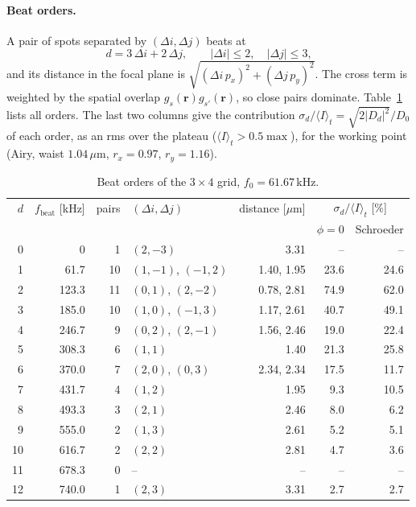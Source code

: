 \paragraph{Beat orders.}
A pair of spots separated by $(\Delta i,\Delta j)$ beats at
\begin{equation}
d=3\,\Delta i+2\,\Delta j ,
\qquad
|\Delta i|\le2,\quad|\Delta j|\le3 ,
\end{equation}
and its distance in the focal plane is
$\sqrt{(\Delta i\,p_x)^2+(\Delta j\,p_y)^2}$. The cross term is weighted by the
spatial overlap $g_s(\mathbf r)g_{s'}(\mathbf r)$, so close pairs dominate.
Table~\ref{tab:beat34} lists all orders. The last two columns give the
contribution $\sigma_d/\langle I\rangle_t=\sqrt{2|D_d|^2}/D_0$ of each order,
as an rms over the plateau ($\langle I\rangle_t>0.5\max$), for the working
point (Airy, waist $1.04\,\mu$m, $r_x=0.97$, $r_y=1.16$).
\begin{table}[h]
\centering
\caption{Beat orders of the $3\times4$ grid, $f_0=61.67$\,kHz.}
\label{tab:beat34}
\small
\begin{tabular}{rrrlrrr}
\hline
$d$ & $f_\mathrm{beat}$ [kHz] & pairs & $(\Delta i,\Delta j)$ & distance [$\mu$m]
 & \multicolumn{2}{c}{$\sigma_d/\langle I\rangle_t$ [\%]}\\
 & & & & & $\phi=0$ & Schroeder\\ \hline
0  & 0     & 1  & $(2,-3)$                & 3.31       & -- & --\\
1  & 61.7  & 10 & $(1,-1)$, $(-1,2)$      & 1.40, 1.95 & 23.6 & 24.6\\
2  & 123.3 & 11 & $(0,1)$, $(2,-2)$       & 0.78, 2.81 & 74.9 & 62.0\\
3  & 185.0 & 10 & $(1,0)$, $(-1,3)$       & 1.17, 2.61 & 40.7 & 49.1\\
4  & 246.7 & 9  & $(0,2)$, $(2,-1)$       & 1.56, 2.46 & 19.0 & 22.4\\
5  & 308.3 & 6  & $(1,1)$                 & 1.40       & 21.3 & 25.8\\
6  & 370.0 & 7  & $(2,0)$, $(0,3)$        & 2.34, 2.34 & 17.5 & 11.7\\
7  & 431.7 & 4  & $(1,2)$                 & 1.95       & 9.3  & 10.5\\
8  & 493.3 & 3  & $(2,1)$                 & 2.46       & 8.0  & 6.2\\
9  & 555.0 & 2  & $(1,3)$                 & 2.61       & 5.2  & 5.1\\
10 & 616.7 & 2  & $(2,2)$                 & 2.81       & 4.7  & 3.6\\
11 & 678.3 & 0  & --                      & --         & --   & --\\
12 & 740.0 & 1  & $(2,3)$                 & 3.31       & 2.7  & 2.7\\
\hline
\end{tabular}
\end{table}

